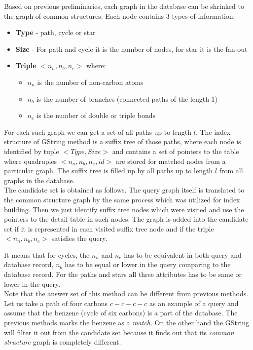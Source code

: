 Based on previous preliminaries, each graph in the database can be shrinked to the graph of common structures. Each node contains 3 types of information:

\begin{itemize}
	\item \textbf{Type} - path, cycle or star
	\item \textbf{Size} - For path and cycle it is the number of nodes, for star it is the fan-out
	
	\item \textbf{Triple} $ <n_{n}, n_{b}, n_{e}> $ where:
	\begin{itemize}
		\item $ n_{n} $ is the number of non-carbon atoms
		\item $ n_{b} $ is the number of branches (connected paths of the length 1)
		\item $ n_{e} $ is the number of double or triple bonds
	\end{itemize}
	
\end{itemize}

For each such graph we can get a set of all paths up to length $ l $. The index structure of GString method is a suffix tree of those paths, where each node is identified by tuple $ <Type, Size> $ and contains a set of pointers to the table where quadruples $ <n_{n}, n_{b}, n_{e}, id> $ are stored for matched nodes from a particular graph. The suffix tree is filled up by all paths up to length $ l $ from all graphs in the database.\\

The candidate set is obtained as follows. The query graph itself is translated to the common structure graph by the same process which was utilized for index building. Then we just identify suffix tree nodes which were visited and use the pointers to the detail table in such nodes. The graph is added into the candidate set if it is represented in each visited suffix tree node and if the triple $ <n_{n}, n_{b}, n_{e}> $ satisfies the query.

It means that for cycles, the $ n_{n} $ and $ n_{e} $ has to be equivalent in both query and database record, $n_{b}$ has to be equal or lower in the query comparing to the database record. For the paths and stars all three attributes has to be same or lower in the query.\\

Note that the answer set of this method can be different from previous methods. Let us take a path of four carbons $ c-c-c-c $ as an example of a query and assume that the benzene (cycle of six carbons) is a part of the database. The previous methods marks the benzene as a \textit{match}. On the other hand the GString will filter it out from the candidate set because it finds out that its \textit{common structure} graph is completely different.\\

